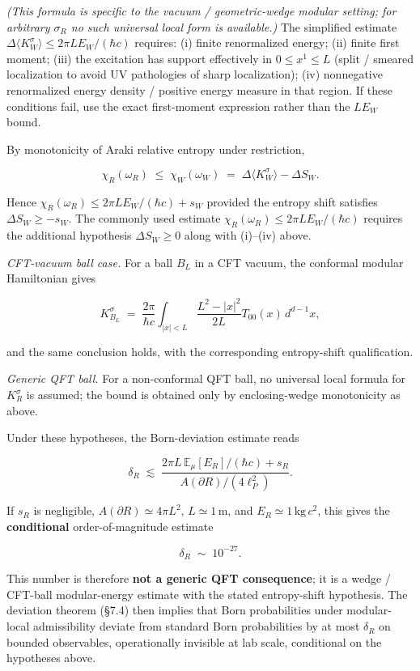 \documentclass[11pt,a4paper]{article}
\begin{document}
\emph{(This formula is specific to the vacuum / geometric-wedge modular setting; for arbitrary $\sigma_R$ no such universal local form is available.)}
The simplified estimate $\Delta\langle K_W^\sigma\rangle \le 2\pi L E_W/(\hbar c)$ requires: (i) finite renormalized energy; (ii) finite first moment; (iii) the excitation has support effectively in $0 \le x^1 \le L$ (split / smeared localization to avoid UV pathologies of sharp localization); (iv) nonnegative renormalized energy density / positive energy measure in that region. If these conditions fail, use the exact first-moment expression rather than the $L E_W$ bound.

By monotonicity of Araki relative entropy under restriction,

\[
\chi_R(\omega_R) \;\le\; \chi_W(\omega_W) \;=\; \Delta\langle K_W^\sigma\rangle - \Delta S_W.
\]

Hence $\chi_R(\omega_R) \le 2\pi L E_W/(\hbar c) + s_W$ provided the entropy shift satisfies $\Delta S_W \ge -s_W$. The commonly used estimate $\chi_R(\omega_R) \le 2\pi L E_W/(\hbar c)$ requires the additional hypothesis $\Delta S_W \ge 0$ along with (i)–(iv) above.

\emph{CFT-vacuum ball case.} For a ball $B_L$ in a CFT vacuum, the conformal modular Hamiltonian gives

\[
K_{B_L}^\sigma \;=\; \frac{2\pi}{\hbar c} \int_{|x| < L} \frac{L^2 - |x|^2}{2L} T_{00}(x) \, d^{d-1}x,
\]

and the same conclusion holds, with the corresponding entropy-shift qualification.

\emph{Generic QFT ball.} For a non-conformal QFT ball, no universal local formula for $K_R^\sigma$ is assumed; the bound is obtained only by enclosing-wedge monotonicity as above.

Under these hypotheses, the Born-deviation estimate reads

\[
\delta_R \;\lesssim\; \frac{2\pi L \, \mathbb{E}_\mu[E_R]/(\hbar c) + s_R}{A(\partial R)/(4\ell_P^2)}.
\]

If $s_R$ is negligible, $A(\partial R) \simeq 4\pi L^2$, $L \simeq 1\,\mathrm{m}$, and $E_R \simeq 1\,\mathrm{kg}\,c^2$, this gives the \textbf{conditional} order-of-magnitude estimate

\[
\delta_R \;\sim\; 10^{-27}.
\]

This number is therefore \textbf{not a generic QFT consequence}; it is a wedge / CFT-ball modular-energy estimate with the stated entropy-shift hypothesis. The deviation theorem (§7.4) then implies that Born probabilities under modular-local admissibility deviate from standard Born probabilities by at most $\delta_R$ on bounded observables, operationally invisible at lab scale, conditional on the hypotheses above.
\end{document}
